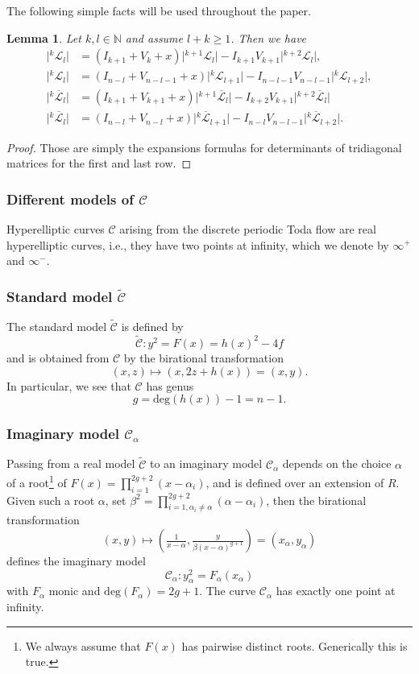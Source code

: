 \documentclass[11pt, a4paper]{amsart}
\newcommand{\eqst}[1]{\begin{equation*}#1\end{equation*}}
\theoremstyle{plain}
\newtheorem{lemma}{Lemma}[section]
\numberwithin{equation}{section}
\begin{document}
\noindent The following simple facts will be used throughout the paper.
\begin{lemma} 
\label{lemmakeymr} 
Let $k,l \in \mathbb N$ and assume $l+k \geq 1$. Then we have 
\begin{align*}
\vert{}^k\mathcal L _l\vert &= (I_{k+1}+V_k +x)\vert{}^{k+1}\mathcal L _l\vert-I_{k+1}V_{k+1} \vert{}^{k+2}\mathcal L_l\vert, \\
\vert{}^k\mathcal L _l\vert &= (I_{n-l}+V_{n-l-1} +x)\vert{}^{k}\mathcal L _{l+1}\vert-I_{n-l-1}V_{n-l-1} \vert{}^{k}\mathcal L_{l+2}\vert,\\
\vert{}^k\overline{\mathcal {L}} _l\vert &= (I_{k+1}+V_{k+1} +x)\vert{}^{k+1}\overline{\mathcal {L}} _l\vert-I_{k+2}V_{k+1} \vert{}^{k+2}\overline{\mathcal {L}}_l\vert\\
\vert{}^k\overline{\mathcal {L}} _l\vert &= (I_{n-l}+V_{n-l} +x)\vert{}^{k}\overline{\mathcal {L}}_{l+1}\vert-I_{n-l}V_{n-l-1} \vert{}^{k}\overline{\mathcal {L}}_{l+2}\vert.
\end{align*}
\end{lemma}
\begin{proof}
Those are simply the expansions formulas for determinants of tridiagonal matrices for the first and last row.
\end{proof}

\subsubsection{Different models of $\mathcal C$}
\noindent Hyperelliptic curves $\mathcal C$ arising from the discrete periodic Toda flow are real hyperelliptic curves, i.e., they have two points at infinity, which we denote by $\infty^+$ and $\infty^-$. 

\subsubsection{Standard model $\widetilde {\mathcal C}$}
The standard model $\widetilde{\mathcal C}$ is defined by \eqst{\tilde {\mathcal C} : y^2 = F(x) = h(x)^2-4 f } and is obtained from $\mathcal C$ by the birational transformation \eqst{(x,z) \longmapsto (x,2 z + h(x)) = (x,y).}
In particular, we see that $\mathcal C$ has genus \eqst{g = \mathrm{deg}(h(x))-1= n-1.} 
\subsubsection{Imaginary model $\mathcal C _\alpha$}
Passing from a real model $\widetilde{\mathcal C}$ to an imaginary model ${\mathcal C} _\alpha$ depends on the choice $\alpha$ of a root\footnote{We always assume that $F(x)$ has pairwise distinct roots. Generically this is true.} of $F(x) = \prod_{i=1}^{2g+2} (x-\alpha_i)$, and is defined over an extension of $R$. Given such a root $\alpha$, set $\beta^2 = \prod_{i=1,\alpha_i \neq \alpha}^{2g+2} (\alpha -\alpha_i)$, then the birational transformation \eqst{(x,y) \longmapsto (\tfrac{1}{x-\alpha},\tfrac{y}{\beta (x-\alpha)^{g+1}}) = (x_\alpha, y_\alpha)} 
defines the imaginary model \eqst{{\mathcal C}_\alpha :  y_\alpha ^2 = F_\alpha(x_\alpha)} with $F_\alpha$ monic and $\mathrm{deg}(F_\alpha) = 2g +1$. The curve $\mathcal C _\alpha$ has exactly one point at infinity.
\end{document}
